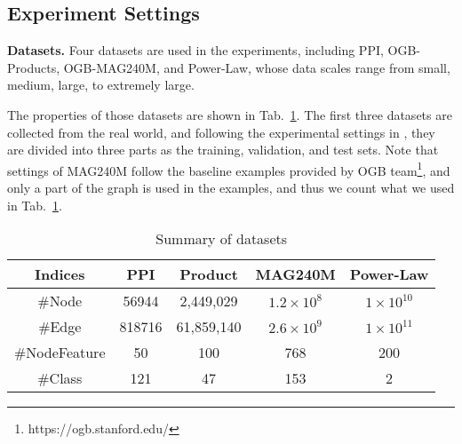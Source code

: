\documentclass[conference]{IEEEtran}
\begin{document}
\subsection{Experiment Settings}
\label{sec_exp_settings}
\textbf{Datasets.} 
Four datasets are used in the experiments, including PPI\cite{b39}, OGB-Products\cite{b40}, OGB-MAG240M\cite{b41}, and Power-Law, whose data scales range from small, medium, large, to extremely large.

The properties of those datasets are shown in Tab.~\ref{tab:datasets}.
The first three datasets are collected from the real world, and following the experimental settings in \cite{b3,b4,b17,b42}, they are divided into three parts as the training, validation, and test sets.
Note that settings of MAG240M follow the baseline examples provided by OGB team\footnote{https://ogb.stanford.edu/}, and only a part of the graph is used in the examples, and thus we count what we used in Tab.~\ref{tab:datasets}.

\begin{table}%
\centering
	\caption{Summary of datasets}
	\label{tab:datasets}
	\begin{tabular}{c|cccc}
		\toprule
		Indices & PPI &Product & MAG240M & Power-Law \\ 
		\midrule
		\#Node   &56944  &2,449,029 &$1.2\times10^8$ & $1\times10^{10}$ \\
		\#Edge  &818716 &61,859,140 & $2.6\times10^9$ & $1\times10^{11}$ \\
		\#NodeFeature &50 &100 & 768 & 200 \\
		\#Class &121 &47 & 153 & 2 \\
		\bottomrule
	\end{tabular}
\end{table}
\end{document}
